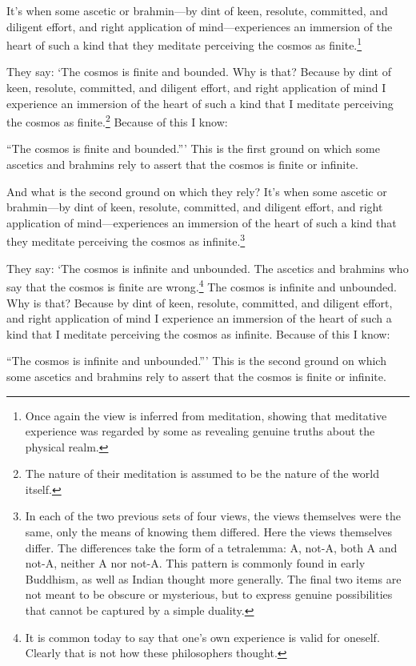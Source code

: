 \documentclass[12pt,openany]{book}%
\begin{document}
It’s when some ascetic or brahmin—by dint of keen, resolute, committed, and diligent effort, and right application of mind—experiences an immersion of the heart of such a kind that they meditate perceiving the cosmos as finite.\footnote{Once again the view is inferred from meditation, showing that meditative experience was regarded by some as revealing genuine truths about the physical realm. } 

They say: ‘The cosmos is finite and bounded. Why is that? Because by dint of keen, resolute, committed, and diligent effort, and right application of mind I experience an immersion of the heart of such a kind that I meditate perceiving the cosmos as finite.\footnote{The nature of their meditation is assumed to be the nature of the world itself. } Because of this I know: 

“The cosmos is finite and bounded.”’ This is the first ground on which some ascetics and brahmins rely to assert that the cosmos is finite or infinite. 

And what is the second ground on which they rely? It’s when some ascetic or brahmin—by dint of keen, resolute, committed, and diligent effort, and right application of mind—experiences an immersion of the heart of such a kind that they meditate perceiving the cosmos as infinite.\footnote{In each of the two previous sets of four views, the views themselves were the same, only the means of knowing them differed. Here the views themselves differ. The differences take the form of a tetralemma: A, not-A, both A and not-A, neither A nor not-A. This pattern is commonly found in early Buddhism, as well as Indian thought more generally. The final two items are not meant to be obscure or mysterious, but to express genuine possibilities that cannot be captured by a simple duality. } 

They say: ‘The cosmos is infinite and unbounded. The ascetics and brahmins who say that the cosmos is finite are wrong.\footnote{It is common today to say that one’s own experience is valid for oneself. Clearly that is not how these philosophers thought. } The cosmos is infinite and unbounded. Why is that? Because by dint of keen, resolute, committed, and diligent effort, and right application of mind I experience an immersion of the heart of such a kind that I meditate perceiving the cosmos as infinite. Because of this I know: 

“The cosmos is infinite and unbounded.”’ This is the second ground on which some ascetics and brahmins rely to assert that the cosmos is finite or infinite. 
\end{document}
